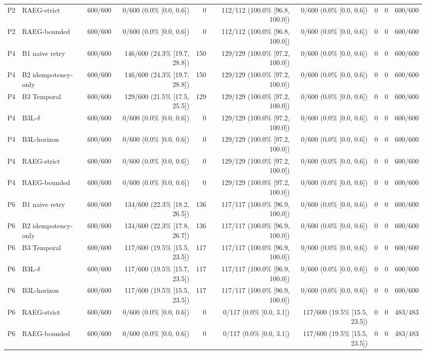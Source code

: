 \begin{table}[t]
\begin{tabular}{llrrrrrrrr}
P2 & RAEG-strict & 600/600 & 0/600 (0.0\% [0.0, 0.6]) & 0 & 112/112 (100.0\% [96.8, 100.0]) & 0/600 (0.0\% [0.0, 0.6]) & 0 & 0 & 600/600 \\
P2 & RAEG-bounded & 600/600 & 0/600 (0.0\% [0.0, 0.6]) & 0 & 112/112 (100.0\% [96.8, 100.0]) & 0/600 (0.0\% [0.0, 0.6]) & 0 & 0 & 600/600 \\
P4 & B1 naive retry & 600/600 & 146/600 (24.3\% [19.7, 28.8]) & 150 & 129/129 (100.0\% [97.2, 100.0]) & 0/600 (0.0\% [0.0, 0.6]) & 0 & 0 & 600/600 \\
P4 & B2 idempotency-only & 600/600 & 146/600 (24.3\% [19.7, 28.8]) & 150 & 129/129 (100.0\% [97.2, 100.0]) & 0/600 (0.0\% [0.0, 0.6]) & 0 & 0 & 600/600 \\
P4 & B3 Temporal & 600/600 & 129/600 (21.5\% [17.5, 25.5]) & 129 & 129/129 (100.0\% [97.2, 100.0]) & 0/600 (0.0\% [0.0, 0.6]) & 0 & 0 & 600/600 \\
P4 & B3L-$\delta$ & 600/600 & 0/600 (0.0\% [0.0, 0.6]) & 0 & 129/129 (100.0\% [97.2, 100.0]) & 0/600 (0.0\% [0.0, 0.6]) & 0 & 0 & 600/600 \\
P4 & B3L-horizon & 600/600 & 0/600 (0.0\% [0.0, 0.6]) & 0 & 129/129 (100.0\% [97.2, 100.0]) & 0/600 (0.0\% [0.0, 0.6]) & 0 & 0 & 600/600 \\
P4 & RAEG-strict & 600/600 & 0/600 (0.0\% [0.0, 0.6]) & 0 & 129/129 (100.0\% [97.2, 100.0]) & 0/600 (0.0\% [0.0, 0.6]) & 0 & 0 & 600/600 \\
P4 & RAEG-bounded & 600/600 & 0/600 (0.0\% [0.0, 0.6]) & 0 & 129/129 (100.0\% [97.2, 100.0]) & 0/600 (0.0\% [0.0, 0.6]) & 0 & 0 & 600/600 \\
P6 & B1 naive retry & 600/600 & 134/600 (22.3\% [18.2, 26.5]) & 136 & 117/117 (100.0\% [96.9, 100.0]) & 0/600 (0.0\% [0.0, 0.6]) & 0 & 0 & 600/600 \\
P6 & B2 idempotency-only & 600/600 & 134/600 (22.3\% [17.8, 26.7]) & 136 & 117/117 (100.0\% [96.9, 100.0]) & 0/600 (0.0\% [0.0, 0.6]) & 0 & 0 & 600/600 \\
P6 & B3 Temporal & 600/600 & 117/600 (19.5\% [15.5, 23.5]) & 117 & 117/117 (100.0\% [96.9, 100.0]) & 0/600 (0.0\% [0.0, 0.6]) & 0 & 0 & 600/600 \\
P6 & B3L-$\delta$ & 600/600 & 117/600 (19.5\% [15.7, 23.5]) & 117 & 117/117 (100.0\% [96.9, 100.0]) & 0/600 (0.0\% [0.0, 0.6]) & 0 & 0 & 600/600 \\
P6 & B3L-horizon & 600/600 & 117/600 (19.5\% [15.5, 23.5]) & 117 & 117/117 (100.0\% [96.9, 100.0]) & 0/600 (0.0\% [0.0, 0.6]) & 0 & 0 & 600/600 \\
P6 & RAEG-strict & 600/600 & 0/600 (0.0\% [0.0, 0.6]) & 0 & 0/117 (0.0\% [0.0, 3.1]) & 117/600 (19.5\% [15.5, 23.5]) & 0 & 0 & 483/483 \\
P6 & RAEG-bounded & 600/600 & 0/600 (0.0\% [0.0, 0.6]) & 0 & 0/117 (0.0\% [0.0, 3.1]) & 117/600 (19.5\% [15.5, 23.5]) & 0 & 0 & 483/483 \\
\bottomrule
\end{tabular}
\end{table}
